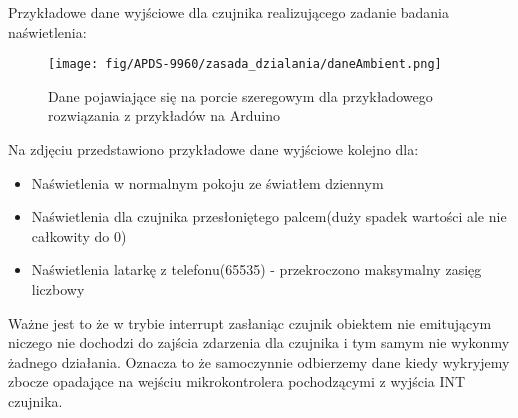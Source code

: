 \documentclass[11pt, a4paper]{article}
\begin{document}
Przykładowe dane wyjściowe dla czujnika realizującego zadanie badania naświetlenia:
\begin{figure}[H]
    \centering
    \texttt{[image: fig/APDS-9960/zasada\_dzialania/daneAmbient.png]}
    \caption{Dane pojawiające się na porcie szeregowym dla przykładowego rozwiązania z przykładów na Arduino}
\end{figure}
Na zdjęciu przedstawiono przykładowe dane wyjściowe kolejno dla:
\begin{itemize}
    \item Naświetlenia w normalnym pokoju ze światłem dziennym
    \item Naświetlenia dla czujnika przesłoniętego palcem(duży spadek wartości ale nie całkowity do 0)
    \item Naświetlenia latarkę z telefonu(65535) - przekroczono maksymalny zasięg liczbowy
\end{itemize}
Ważne jest to że w trybie interrupt zasłaniąc czujnik obiektem nie emitującym niczego nie dochodzi do zajścia zdarzenia dla czujnika i tym samym nie wykonmy żadnego działania. Oznacza to że samoczynnie odbierzemy dane kiedy wykryjemy zbocze opadające na wejściu mikrokontrolera pochodzącymi z wyjścia INT czujnika.


\newpage
\printbibliography[heading=bibintoc]
\end{document}
